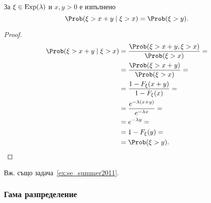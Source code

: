 \documentclass[numbers=endperiod, bibliography=totocnumbered]{scrartcl}
\begin{document}
\begin{theorem}\label{thm:memorylessness}
  За \( \xi \in \operatorname{Exp}(\lambda) \) и \( x, y > 0 \) е изпълнено
  \begin{equation*}
    \Prob(\xi > x + y \mid \xi > x) = \Prob(\xi > y).
  \end{equation*}
\end{theorem}
\begin{proof}
  \begin{align*}
    \Prob(\xi > x + y \mid \xi > x)
    &=
    \frac {\Prob(\xi > x + y, \xi > x)} {\Prob(\xi > x)}
    = \\ &=
    \frac {\Prob(\xi > x + y)} {\Prob(\xi > x)}
    = \\ &=
    \frac {1-F_\xi(x+y)} {1-F_\xi(x)}
    = \\ &=
    \frac {e^{-\lambda(x+y)}} {e^{-\lambda x}}
    = \\ &=
    e^{-\lambda y}
    = \\ &=
    1-F_\xi(y)
    = \\ &=
    \Prob(\xi > y).
  \end{align*}
\end{proof}

Вж. също задача~\ref{ex:se_summer2011}.

\subsubsection{Гама разпределение}\label{dist:gamma}
\end{document}
